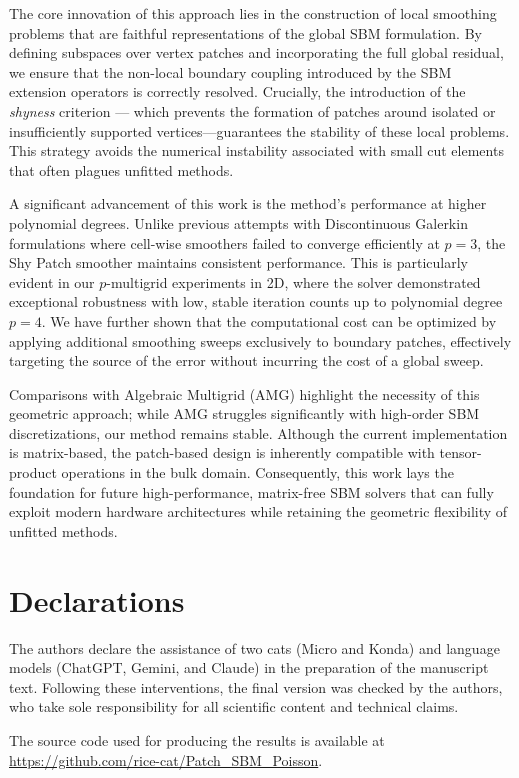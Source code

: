 \documentclass{elsarticle}
\begin{document}
The core innovation of this approach lies in the construction of local smoothing problems that are faithful
representations of the global SBM formulation. By defining subspaces over vertex patches and incorporating the full
global residual, we ensure that the non-local boundary coupling introduced by the SBM extension operators is correctly
resolved. Crucially, the introduction of the \emph{shyness} criterion --- which prevents the formation of patches
around isolated or insufficiently supported vertices—guarantees the stability of these local problems. This strategy
avoids the numerical instability associated with small cut elements that often plagues unfitted methods.

A significant advancement of this work is the method's performance at higher polynomial degrees. Unlike previous
attempts with Discontinuous Galerkin formulations where cell-wise smoothers failed to converge efficiently at $p=3$,
the Shy Patch smoother maintains consistent performance. This is particularly evident in our $p$-multigrid experiments
in 2D, where the solver demonstrated exceptional robustness with low, stable iteration counts up to polynomial degree
$p=4$. We have further shown that the computational cost can be optimized by applying additional smoothing sweeps
exclusively to boundary patches, effectively targeting the source of the error without incurring the cost of a global
sweep.

Comparisons with Algebraic Multigrid (AMG) highlight the necessity of this geometric approach; while AMG struggles
significantly with high-order SBM discretizations, our method remains stable. Although the current implementation is
matrix-based, the patch-based design is inherently compatible with tensor-product operations in the bulk domain.
Consequently, this work lays the foundation for future high-performance, matrix-free SBM solvers that can fully exploit
modern hardware architectures while retaining the geometric flexibility of unfitted methods.

\section*{Declarations}

The authors declare the assistance of two cats (Micro and Konda) and language models (ChatGPT, Gemini, and Claude) in
the preparation of the manuscript text. Following these interventions, the final version was checked by the authors,
who take sole responsibility for all scientific content and technical claims.

The source code used for producing the results is available at \url{https://github.com/rice-cat/Patch_SBM_Poisson}.

\FloatBarrier




\end{document}
